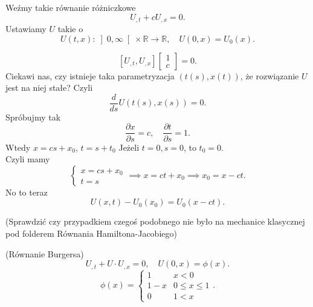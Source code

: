 \documentclass[../main.tex]{subfiles}
\begin{document}
    Weźmy takie równanie różniczkowe
    \[
        U_{,t} + c U_{,x} = 0
    .\]
Ustawiamy $U$ takie o
\[
    U(t,x): \left]0,\infty\right[ \times \mathbb{R} \to \mathbb{R},\quad U(0,x) = U_0(x)
.\]

\[
    \left[ U_{,t}, U_{,x} \right] \begin{bmatrix} 1\\c \end{bmatrix} = 0
.\]
Ciekawi nas, czy istnieje taka parametryzacja $(t(s), x(t))$, że rozwiązanie $U$ jest na niej stałe? Czyli
\[
    \frac{d}{ds} U(t(s), x(s)) = 0
.\]
Spróbujmy tak
\[
    \frac{\partial x}{\partial s} = c,\quad \frac{\partial t}{\partial s} = 1
.\]
Wtedy $x = c s + x_0$, $t = s + t_0$
Jeżeli $t = 0, s = 0$, to $t_0 = 0$.\\
Czyli mamy
\[
    \begin{cases}
        x = cs + x_0\\
        t = s
    \end{cases} \implies x = ct + x_0 \implies x_0 = x - ct
.\]
No to teraz
\[
    U(x,t) - U_0(x_0) = U_0(x-ct)
.\]

(Sprawdzić czy przypadkiem czegoś podobnego nie było na mechanice klasycznej pod folderem Równania Hamiltona-Jacobiego)

\begin{tw}
    (Równanie Burgersa)\\
    \[
        U_{,t} + U \cdot U_{,x} = 0,\quad U(0,x) = \phi(x)
    .\]
\[
    \phi(x) = \begin{cases}
        1 & x <0\\
        1-x & 0\le x \le 1\\
        0 &1 < x
    \end{cases}
.\]
\end{tw}
\end{document}
